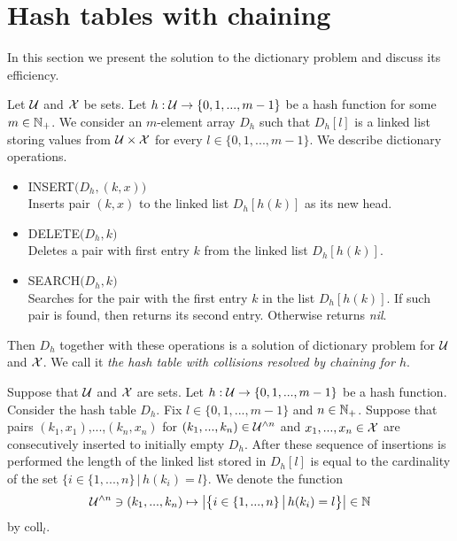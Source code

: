 \section{Hash tables with chaining}
\noindent
In this section we present the solution to the dictionary problem and discuss its efficiency.

\begin{definition}
Let ${\mathcal U}$ and ${\mathcal X}$ be sets. Let $h:{\mathcal U}\rightarrow \{0,1,...,m-1\}$ be a hash function for some $m\in {\mathbb N}_+$. We consider an $m$-element array $D_h$ such that $D_h[l]$ is a linked list storing values from ${\mathcal U}\times {\mathcal X}$ for every $l\in \{0,1,...,m-1\}$. We describe dictionary operations.
\begin{itemize}
\item[] \textrm{INSERT}$\big(D_h,(k,x)\big)$\\
Inserts pair $(k,x)$ to the linked list $D_h[h(k)]$ as its new head.
\item[] \textrm{DELETE}$\big(D_h,k\big)$\\
Deletes a pair with first entry $k$ from the linked list $D_h[h(k)]$.
\item[] \textrm{SEARCH}$\big(D_h,k\big)$\\
Searches for the pair with the first entry $k$ in the list $D_h[h(k)]$. If such pair is found, then returns its second entry. Otherwise returns \textit{nil}. 
\end{itemize}
Then $D_h$ together with these operations is a solution of dictionary problem for ${\mathcal U}$ and ${\mathcal X}$. We call it \textit{the hash table with collisions resolved by chaining for $h$}.
\end{definition}
\noindent
Suppose that ${\mathcal U}$ and ${\mathcal X}$ are sets. Let $h:{\mathcal U}\rightarrow \{0,1,...,m-1\}$ be a hash function. Consider the hash table $D_h$. Fix $l\in \{0,1,...,m-1\}$ and $n\in {\mathbb N}_+$. Suppose that pairs $(k_1,x_1)$,...,$(k_n,x_n)$ for $(k_1,...,k_n)\in {\mathcal U}^{\wedge n}$ and $x_1,...,x_n\in {\mathcal X}$ are consecutively inserted to initially empty $D_h$. After these sequence of insertions is performed the length of the linked list stored in $D_h[l]$ is equal to the cardinality of the set $\big\{i\in \{1,...,n\}\,\big|\,h(k_i) = l\big\}$. We denote the function
$${\mathcal U}^{\wedge n}\ni (k_1,...,k_n) \mapsto \big|\big\{i\in \{1,...,n\}\,\big|\,h(k_i) = l\big\}\big| \in {\mathbb N}$$
by $\mathrm{coll}_l$.

